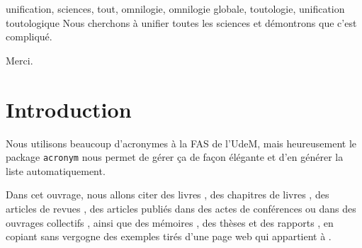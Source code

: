 \documentclass[phd]{dissertum}
\date{Novembre}{2026}
\begin{document}
  \pagetitre
  \pagejury

  \begin{resume}{unification, sciences, tout, omnilogie, omnilogie globale, toutologie, unification toutologique}
    Nous cherchons à unifier toutes les sciences et démontrons que c'est compliqué.
  \end{resume}

  \begin{abstract}{unification, sciences, everything, omniology, global omniology, holology, holological unification}
    We try to unify all sciences and demonstrate that it is complicated.
  \end{abstract}

  \matieres

    \begin{acronym}
    \end{acronym}


    Merci.

    \lipsum[1-2]


  \chapter{Introduction}
    Nous utilisons beaucoup d'acronymes à la \ac{FAS} de l'\ac{UdeM}, mais heureusement le package \texttt{acronym} nous permet de gérer ça de façon élégante et d'en générer la liste automatiquement.

    Dans cet ouvrage, nous allons citer des livres \parencite{livre}, des chapitres de livres \parencite{chapitre}, des articles de revues \parencite{revue}, des articles publiés dans des actes de conférences \parencite{actes} ou dans des ouvrages collectifs \parencite{coll}, ainsi que des mémoires \parencite{ma}, des thèses \parencite{phd} et des rapports \parencite{rapport}, en copiant sans vergogne des exemples tirés d'une page web qui appartient à \textcite{web}.
\end{document}
